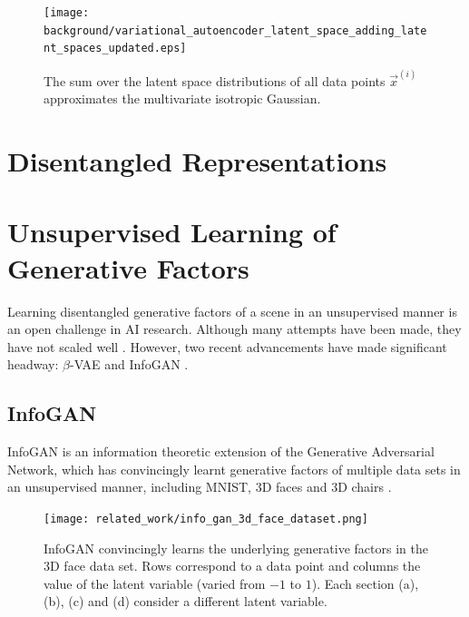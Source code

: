 \begin{landscape}
\begin{figure}[h!]
\centering
\captionsetup{justification=centering}
\texttt{[image: background/variational\_autoencoder\_latent\_space\_adding\_latent\_spaces\_updated.eps]}
\caption{\vspace*{-20mm}The sum over the latent space distributions of all data points $\vec{x}^{(i)}$ approximates the multivariate isotropic Gaussian. \cite{Dykeman2016}}
\label{fig:variational_autoencoder_latent_space_adding_latent_spaces_updated}
\end{figure}
\end{landscape}



%
%
%
%
%
\section{Disentangled Representations}
\cite{Higgins2016, Thiagarajan2016}





%
%
%
%
%
\section{Unsupervised Learning of Generative Factors}
Learning disentangled generative factors of a scene in an unsupervised manner is an open challenge in AI research. Although many attempts have been made, they have not scaled well \cite{Thiagarajan2016, Schmidhuber1992, Desjardins2012, Tang2013, Cohen2014}. However, two recent advancements have made significant headway: $\beta$-VAE and InfoGAN \cite{Chen2016, Thiagarajan2016}.

\subsection{InfoGAN}
InfoGAN is an information theoretic extension of the Generative Adversarial Network, which has convincingly learnt generative factors of multiple data sets in an unsupervised manner, including MNIST, 3D faces and 3D chairs \cite{Chen2016}.

\begin{figure}[h!]
\centering
\captionsetup{justification=centering}
\texttt{[image: related\_work/info\_gan\_3d\_face\_dataset.png]}
\caption{InfoGAN convincingly learns the underlying generative factors in the 3D face data set. Rows correspond to a data point and columns the value of the latent variable (varied from $-1$ to $1$). Each section (a), (b), (c) and (d) consider a different latent variable. \cite{Chen2016}}
\label{fig:info_gan_3d_face_dataset}
\end{figure}

